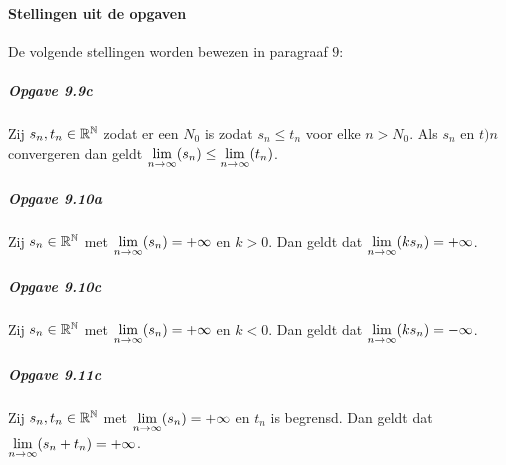\paragraph{Stellingen uit de opgaven} De volgende stellingen worden bewezen in paragraaf $9$:

\subparagraph{Opgave 9.9c} Zij $s_{n},t_{n}\in\mathbb{R}^{\mathbb{N}}$ zodat er een $N_{0}$ is zodat $s_{n} \leq t_{n}$ voor elke $n>N_{0}$. Als $s_{n}$ en $t){n}$ convergeren dan geldt $\underset{n\to\infty}{\text{lim}}(s_{n})\leq\underset{n\to\infty}{\text{lim}}(t_{n})$.

\subparagraph{Opgave 9.10a} Zij $s_{n}\in\mathbb{R}^{\mathbb{N}}$ met $\underset{n\to\infty}{\text{lim}}(s_{n})=+\infty$ en $k>0$. Dan geldt dat $\underset{n\to\infty}{\text{lim}}(ks_{n})=+\infty$.

\subparagraph{Opgave 9.10c} Zij $s_{n}\in\mathbb{R}^{\mathbb{N}}$ met $\underset{n\to\infty}{\text{lim}}(s_{n})=+\infty$ en $k<0$. Dan geldt dat $\underset{n\to\infty}{\text{lim}}(ks_{n})=-\infty$.

\subparagraph{Opgave 9.11c} Zij $s_{n},t_{n}\in\mathbb{R}^{\mathbb{N}}$ met $\underset{n\to\infty}{\text{lim}}(s_{n})=+\infty$ en $t_{n}$ is begrensd. Dan geldt dat\\ $\underset{n\to\infty}{\text{lim}}(s_{n}+t_{n})=+\infty$.